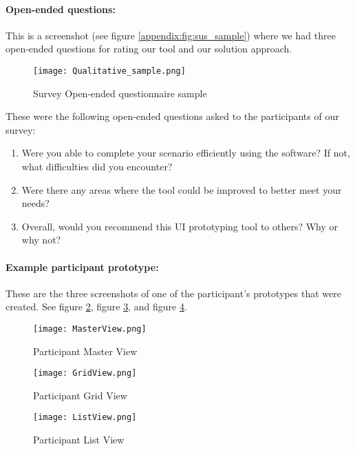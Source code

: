 \paragraph{Open-ended questions:} This is a screenshot (see figure \ref{appendix:fig:sus_sample}) where we had three open-ended questions for rating our tool and our solution approach. 
\begin{figure}[ht]
    \centering
    \texttt{[image: Qualitative\_sample.png]}
    \caption[Open-Ended Questionnaire]{Survey Open-ended questionnaire sample}
    \label{appendix:fig:qualitative_sample}
\end{figure}

These were the following open-ended questions asked to the participants of our survey:
\begin{enumerate}
    \item Were you able to complete your scenario efficiently using the software? If not, what difficulties did you encounter?
    \item Were there any areas where the tool could be improved to better meet your needs?
    \item Overall, would you recommend this UI prototyping tool to others? Why or why not?
\end{enumerate}
\paragraph{Example participant prototype:} These are the three screenshots of one of the participant's prototypes that were created. See figure \ref{appendix:fig:masterview}, figure \ref{appendix:fig:gridview}, and figure \ref{appendix:fig:listview}.
\begin{figure}[ht]
    \centering
    \texttt{[image: MasterView.png]}
    \caption[Example Prototype]{Participant Master View}
    \label{appendix:fig:masterview}
\end{figure}

\begin{figure}[ht]
    \centering
    \texttt{[image: GridView.png]}
    \caption[Example Prototype]{Participant Grid View}
    \label{appendix:fig:gridview}
\end{figure}

\begin{figure}[ht]
    \centering
    \texttt{[image: ListView.png]}
    \caption[Example Prototype]{Participant List View}
    \label{appendix:fig:listview}
\end{figure}

